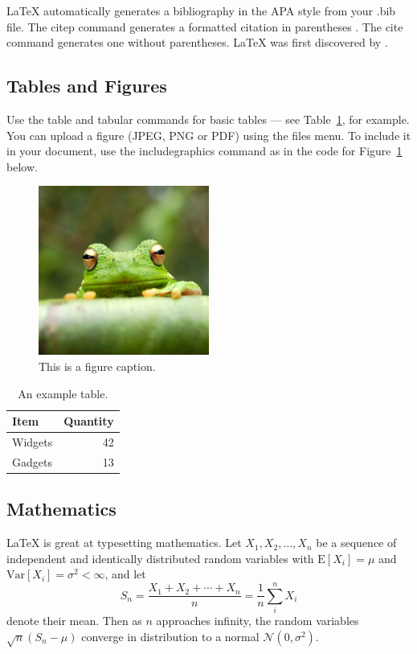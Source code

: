 \documentclass[a4paper,man,natbib]{apa6}
\begin{document}
LaTeX automatically generates a bibliography in the APA style from your .bib file. The citep command generates a formatted citation in parentheses \citep{Lamport1986}. The cite command generates one without parentheses. LaTeX was first discovered by \cite{Lamport1986}.

\subsection{Tables and Figures}

Use the table and tabular commands for basic tables --- see Table~\ref{tab:widgets}, for example. You can upload a figure (JPEG, PNG or PDF) using the files menu. To include it in your document, use the includegraphics command as in the code for Figure~\ref{fig:frog} below.

\begin{figure}
\centering
\includegraphics[width=0.5\textwidth]{frog.jpg}
\caption{\label{fig:frog}This is a figure caption.}
\end{figure}

\begin{table}
\centering
\begin{tabular}{l|r}
Item & Quantity \\\hline
Widgets & 42 \\
Gadgets & 13
\end{tabular}
\caption{\label{tab:widgets}An example table.}
\end{table}

\subsection{Mathematics}

\LaTeX{} is great at typesetting mathematics. Let $X_1, X_2, \ldots, X_n$ be a sequence of independent and identically distributed random variables with $\text{E}[X_i] = \mu$ and $\text{Var}[X_i] = \sigma^2 < \infty$, and let
$$S_n = \frac{X_1 + X_2 + \cdots + X_n}{n}
      = \frac{1}{n}\sum_{i}^{n} X_i$$
denote their mean. Then as $n$ approaches infinity, the random variables $\sqrt{n}(S_n - \mu)$ converge in distribution to a normal $\mathcal{N}(0, \sigma^2)$.
\end{document}

